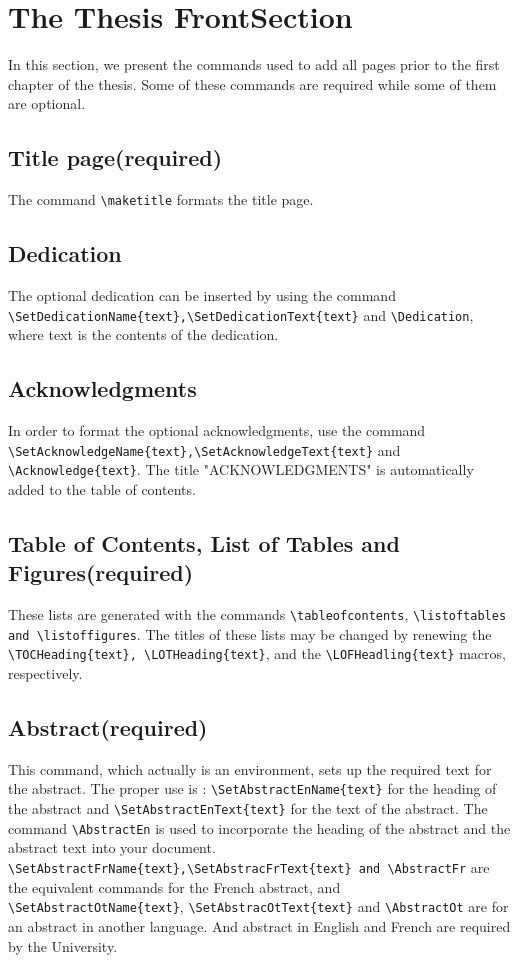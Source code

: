 \documentclass[12pt,Bold,letterpaper,TexShade]{mcgilletdclass}
\begin{document}
\chapter{The Thesis FrontSection}
In this section, we present the commands used to add all pages prior to
the first chapter of the thesis. Some of these commands are required
while some of them are optional.
\section{Title page(required)}
The command \verb=\maketitle= formats the title page. 
\section{Dedication}
The optional dedication can be inserted by using the command 
\verb=\SetDedicationName{text},\SetDedicationText{text}= and
\verb=\Dedication=, where text is the contents of the dedication.
\section{Acknowledgments}
In order to format the optional acknowledgments, use the command 
\verb=\SetAcknowledgeName{text},\SetAcknowledgeText{text}= and
\verb=\Acknowledge{text}=. The title "ACKNOWLEDGMENTS" is automatically
added to the table of contents. 
\section{Table of Contents, List of Tables and Figures(required)}
These lists are generated with the commands \verb=\tableofcontents=,
\verb=\listoftables and \listoffigures=. The titles of these lists may
be changed by renewing the \verb=\TOCHeading{text}, \LOTHeading{text}=, and
the \verb=\LOFHeadling{text}= macros, respectively.
\section{Abstract(required)}
This command, which actually is an environment, sets up the required 
text for the abstract. The proper use is : \verb=\SetAbstractEnName{text}=
for the heading of the abstract and \verb=\SetAbstractEnText{text}= for the 
text of the abstract. The command \verb=\AbstractEn= is used to incorporate 
the heading of the abstract and the abstract text into your document.
\verb=\SetAbstractFrName{text},\SetAbstracFrText{text} and \AbstractFr= are the
equivalent commands for the French abstract, and \verb=\SetAbstractOtName{text}=, 
\verb=\SetAbstracOtText{text}= and \verb=\AbstractOt= are for an abstract in 
another language. And abstract in English and French are required by the University.
\end{document}
